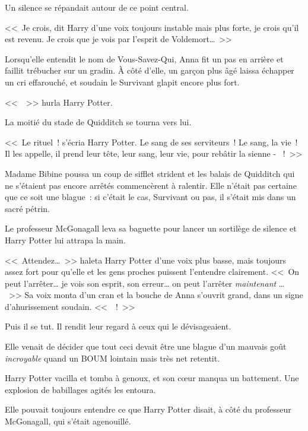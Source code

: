 Un silence se répandait autour de ce point central.

<<~Je crois, dit Harry d'une voix toujours instable mais plus forte, je crois qu'il est revenu. Je crois que je vois par l'esprit de Voldemort…~>>

Lorsqu'elle entendit le nom de Vous-Savez-Qui, Anna fit un pas en arrière et faillit trébucher sur un gradin. À côté d'elle, un garçon plus âgé laissa échapper un cri effarouché, et soudain le Survivant glapit encore plus fort.

<<~~>> hurla Harry Potter.

La moitié du stade de Quidditch se tourna vers lui.

<<~Le rituel~! s'écria Harry Potter. Le sang de ses serviteurs~! Le sang, la vie~! Il les appelle, il prend leur tête, leur sang, leur vie, pour rebâtir la sienne - ~!~>>

Madame Bibine poussa un coup de sifflet strident et les balais de Quidditch qui ne s'étaient pas encore arrêtés commencèrent à ralentir. Elle n'était pas certaine que ce soit une blague~: si c'était le cas, Survivant ou pas, il s'était mis dans un sacré pétrin.

Le professeur McGonagall leva sa baguette pour lancer un sortilège de silence et Harry Potter lui attrapa la main.

<<~Attendez…~>> haleta Harry Potter d'une voix plus basse, mais toujours assez fort pour qu'elle et les gens proches puissent l'entendre clairement. <<~On peut l'arrêter… je vois son esprit, son erreur… on peut l'arrêter \emph{maintenant} … ~>> Sa voix monta d'un cran et la bouche de Anna s'ouvrit grand, dans un signe d'ahurissement soudain. <<~~!~>>

Puis il se tut. Il rendit leur regard à ceux qui le dévisageaient.

Elle venait de décider que tout ceci devait être une blague d'un mauvais goût \emph{incroyable} quand un BOUM lointain mais très net retentit.

Harry Potter vacilla et tomba à genoux, et son cœur manqua un battement. Une explosion de babillages agités les entoura.

Elle pouvait toujours entendre ce que Harry Potter disait, à côté du professeur McGonagall, qui s'était agenouillé.

